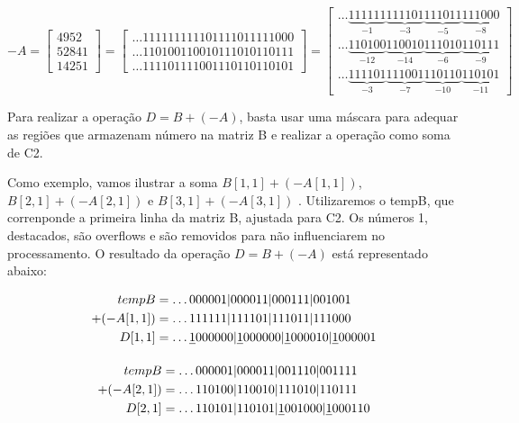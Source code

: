 \documentclass[12pt]{article}
\begin{document}
\begin{equation}
	-A = \begin{bmatrix}
			4952\\ 
			52841\\ 
			14251
		\end{bmatrix} 
        =
        \begin{bmatrix}
   			\ldots111111111101111011111000\\ 
			\ldots110100110010111010110111\\ 
			\ldots111101111001110110110101
		\end{bmatrix}
        =
        \begin{bmatrix}
 \ldots\underbrace{111111}_{-1}\underbrace{111101}_{-3}\underbrace{111011}_{-5}
\underbrace{111000}_{-8}\\
\ldots\underbrace{110100}_{-12}\underbrace{110010}_{-14}\underbrace{111010}_{-6}
\underbrace{110111}_{-9}\\
\ldots\underbrace{111101}_{-3}\underbrace{111001}_{-7}\underbrace{110110}_{-10}
\underbrace{110101}_{-11}
		\end{bmatrix}
\end{equation}

Para realizar a operação  $D = B + (-A)$, basta usar uma máscara para adequar as
regiões que armazenam número na matriz B e realizar a operação como soma de C2.

Como exemplo, vamos ilustrar a soma $B[1,1] + (-A[1,1])$, $B[2,1] + (-A[2,1])$ e
$B[3,1] + (-A[3,1])$ . Utilizaremos o tempB, que correnponde a primeira linha da
matriz B, ajustada para C2. Os números 1, destacados, são overflows e são
removidos para não influenciarem no processamento. O resultado da operação $D =
B + (-A)$ está representado abaixo:

\begin{align*}
	tempB	&=\ldots000001|000011|000111|001001\\
+(-A[1,1])	&=\ldots111111|111101|111011|111000\\
	D[1,1]
&=\ldots\sout{1}000000|\sout{1}000000|\sout{1}000010|\sout{1}000001
\end{align*}

\begin{align*}
	tempB &= \ldots000001|000011|001110|001111\\
+(-A[2,1])&= \ldots110100|110010|111010|110111\\ 
D[2,1]	  &= \ldots110101|110101|\sout{1}001000|\sout{1}000110
\end{align*}
\end{document}
